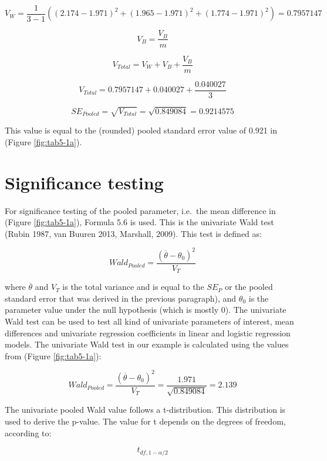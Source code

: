 \documentclass[]{book}
\theoremstyle{definition}
\theoremstyle{definition}
\theoremstyle{definition}
\theoremstyle{remark}
\begin{document}
\[V_W = \frac{1}{3-1}((2.174-1.971)^2+ (1.965-1.971)^2+(1.774-1.971)^2)=0.7957147\]

\[V_B = \frac{V_B}{m}\]

\begin{equation}
V_{Total} = V_W + V_B + \frac{V_B}{m}
  \label{eq:var-t}
\end{equation}

\[V_{Total} = 0.7957147+0.040027 + \frac{0.040027}{3}\]

\[SE_{Pooled} = \sqrt{V_{Total}} = \sqrt{0.849084} = 0.9214575\]

This value is equal to the (rounded) pooled standard error value of
0.921 in (Figure \ref{fig:tab5-1a}).

\section{Significance testing}\label{significance-testing}

For significance testing of the pooled parameter, i.e.~the mean
difference in (Figure \ref{fig:tab5-1a}), Formula 5.6 is used. This is
the univariate Wald test (Rubin 1987, van Buuren 2013, Marshall, 2009).
This test is defined as:

\begin{equation}
Wald_{Pooled} =\frac{(\overline{\theta} - {\theta_0})^2}{V_T}
  \label{eq:wald-pooled}
\end{equation}

where \(\overline{\theta}\) and \(V_T\) is the total variance and is
equal to the \(SE_P\) or the pooled standard error that was derived in
the previous paragraph), and \(\theta_0\) is the parameter value under
the null hypothesis (which is mostly 0). The univariate Wald test can be
used to test all kind of univariate parameters of interest, mean
differences and univariate regression coefficients in linear and
logistic regression models. The univariate Wald test in our example is
calculated using the values from (Figure \ref{fig:tab5-1a}):

\[Wald_{Pooled} =\frac{(\overline{\theta} - {\theta_0})^2}{V_T}=\frac{1.971}{\sqrt{0.849084}}=2.139\]

The univariate pooled Wald value follows a t-distribution. This
distribution is used to derive the p-value. The value for t depends on
the degrees of freedom, according to:

\begin{equation}
t_{df,1-\alpha/2}
  \label{eq:t-distr}
\end{equation}
\end{document}
